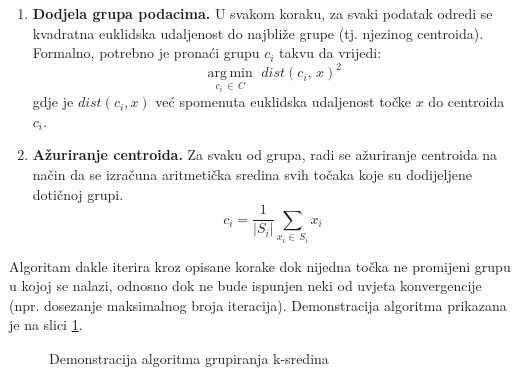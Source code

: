 \documentclass[times, utf8, zavrsni, numeric]{fer}
\begin{document}
\begin{enumerate}
\item \textbf{Dodjela grupa podacima.} U svakom koraku, za svaki podatak odredi se kvadratna euklidska udaljenost do najbliže grupe (tj. njezinog centroida). Formalno, potrebno je pronaći grupu $c_{i}$ takvu da vrijedi:
\begin{equation}
{\displaystyle {\underset{{c_i}\,\in\,C}{\operatorname {arg\,min}}}\,\,dist({c_i},\,x)^2}
\end{equation}
gdje je $dist(c_i, x)$ već spomenuta euklidska udaljenost točke $x$ do centroida $c_i$.
\item \textbf{Ažuriranje centroida.} Za svaku od grupa, radi se ažuriranje centroida na način da se izračuna aritmetička sredina svih točaka koje su dodijeljene dotičnoj grupi.
\begin{equation}
{\displaystyle {c_i}}=\frac{1}{|S_i|} \sum_{x_i\in\,S_i}^{} x_i
\end{equation}
\end{enumerate}
Algoritam dakle iterira kroz opisane korake dok nijedna točka ne promijeni grupu u kojoj se nalazi, odnosno dok ne bude ispunjen neki od uvjeta konvergencije (npr. dosezanje maksimalnog broja iteracija). Demonstracija algoritma prikazana je na slici
\ref{img:clustering_alg}.

\begin{figure}
\caption{Demonstracija algoritma grupiranja k-sredina}
\label{img:clustering_alg}
\end{figure}
\end{document}
